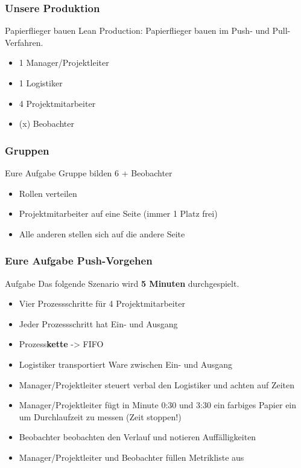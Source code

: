 \begin{frame}
	\frametitle{Unsere Produktion}
	\begin{exampleblock}{Papierflieger bauen}
		Lean Production: Papierflieger bauen im Push- und Pull-Verfahren.
	\end{exampleblock}
	\begin{itemize}[<+->]
		\item 1 Manager/Projektleiter
		\item 1 Logistiker
		\item 4 Projektmitarbeiter
		\item (x) Beobachter
	\end{itemize}
\end{frame}
\begin{frame}
	\frametitle{Gruppen}
	\begin{exampleblock}{Eure Aufgabe}
		Gruppe bilden 6 + Beobachter
	\end{exampleblock}
	\pause
	\begin{itemize}[<+->]
			\item Rollen verteilen
			\item Projektmitarbeiter auf eine Seite (immer 1 Platz frei)
			\item Alle anderen stellen sich auf die andere Seite
		\end{itemize}
\end{frame}
\begin{frame}
	\frametitle{Eure Aufgabe Push-Vorgehen}
	\begin{exampleblock}{Aufgabe}
		Das folgende Szenario wird \textbf{5 Minuten} durchgespielt.
	\end{exampleblock}
	\begin{itemize}[<+->]
		\item Vier Prozessschritte für 4 Projektmitarbeiter
		\item Jeder Prozessschritt hat Ein- und Ausgang
		\item Prozess\textbf{kette} -> FIFO
		\item Logistiker transportiert Ware zwischen Ein- und Ausgang
		\item Manager/Projektleiter steuert verbal den Logistiker und achten auf Zeiten
		\item Manager/Projektleiter fügt in Minute 0:30 und 3:30 ein farbiges Papier ein um Durchlaufzeit zu messen (Zeit stoppen!)
		\item Beobachter beobachten den Verlauf und notieren Auffälligkeiten
		\item  Manager/Projektleiter und Beobachter füllen Metrikliste aus
	\end{itemize}
\end{frame}
